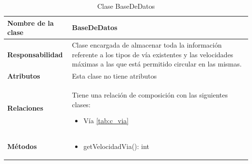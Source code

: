 \begin{table}[h]
\begin{center}
\begin{tabular}{p{} p{11cm}}
\textbf{Nombre de la clase} &  BaseDeDatos\\ \hline \hline
\textbf{Responsabilidad} &  Clase encargada de almacenar toda la información referente a los tipos de vía existentes y las velocidades máximas a las que está permitido circular en las mismas.   \\ \hline
\textbf{Atributos} & Esta clase no tiene atributos\\ \hline
\textbf{Relaciones} & \par Tiene una relación de composición con las siguientes clases:
                      \begin{itemize}
                        \item Vía \ref{tab:c_via}
                      \end{itemize}



                      \\ \hline

\textbf{Métodos} &  \begin{itemize}
                      \item getVelocidadVia(): int
                      \end{itemize}\\ \hline
\end{tabular}
\caption{Clase BaseDeDatos}
\label{tab:c_bbdd}
\end{center}
\end{table}









